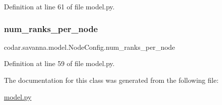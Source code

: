 Definition at line 61 of file model.\+py.

\mbox{\label{classcodar_1_1savanna_1_1model_1_1_node_config_abfaac776b1cc5d4b0e6b3dd9d57a32be}} 
\subsubsection{\texorpdfstring{num\+\_\+ranks\+\_\+per\+\_\+node}{num\_ranks\_per\_node}}
{\footnotesize\ttfamily codar.\+savanna.\+model.\+Node\+Config.\+num\+\_\+ranks\+\_\+per\+\_\+node}



Definition at line 59 of file model.\+py.



The documentation for this class was generated from the following file\+:\begin{DoxyCompactItemize}
\item 
\hyperlink{model_8py}{model.\+py}\end{DoxyCompactItemize}
